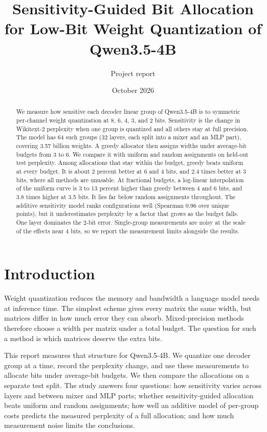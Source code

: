 \documentclass[11pt]{article}
\title{Sensitivity-Guided Bit Allocation for Low-Bit Weight Quantization of Qwen3.5-4B}
\author{Project report}
\date{October 2026}
\begin{document}
\maketitle

\begin{abstract}
We measure how sensitive each decoder linear group of Qwen3.5-4B is to symmetric per-channel weight quantization at 8, 6, 4, 3, and 2 bits. Sensitivity is the change in Wikitext-2 perplexity when one group is quantized and all others stay at full precision. The model has 64 such groups (32 layers, each split into a mixer and an MLP part), covering 3.57 billion weights. A greedy allocator then assigns widths under average-bit budgets from 3 to 6. We compare it with uniform and random assignments on held-out test perplexity. Among allocations that stay within the budget, greedy beats uniform at every budget. It is about 2 percent better at 6 and 4 bits, and 2.4 times better at 3 bits, where all methods are unusable. At fractional budgets, a log-linear interpolation of the uniform curve is 3 to 13 percent higher than greedy between 4 and 6 bits, and 3.8 times higher at 3.5 bits. It lies far below random assignments throughout. The additive sensitivity model ranks configurations well (Spearman 0.96 over unique points), but it underestimates perplexity by a factor that grows as the budget falls. One layer dominates the 2-bit error. Single-group measurements are noisy at the scale of the effects near 4 bits, so we report the measurement limits alongside the results.
\end{abstract}

\section{Introduction}

Weight quantization reduces the memory and bandwidth a language model needs at inference time. The simplest scheme gives every matrix the same width, but matrices differ in how much error they can absorb. Mixed-precision methods therefore choose a width per matrix under a total budget. The question for such a method is which matrices deserve the extra bits.

This report measures that structure for Qwen3.5-4B. We quantize one decoder group at a time, record the perplexity change, and use these measurements to allocate bits under average-bit budgets. We then compare the allocations on a separate test split. The study answers four questions: how sensitivity varies across layers and between mixer and MLP parts; whether sensitivity-guided allocation beats uniform and random assignments; how well an additive model of per-group costs predicts the measured perplexity of a full allocation; and how much measurement noise limits the conclusions.
\end{document}

